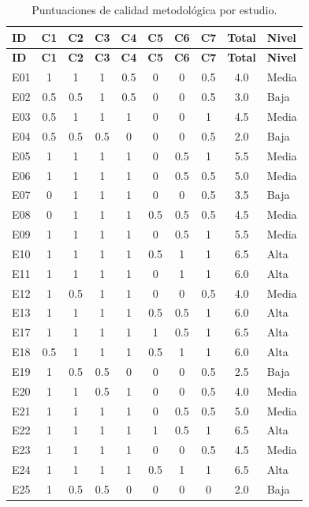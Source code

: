 \begin{longtable}{lccccccccl}
\caption{Puntuaciones de calidad metodológica por estudio.}
\label{tab:calidad} \\
\toprule
\textbf{ID} & \textbf{C1} & \textbf{C2} & \textbf{C3} & \textbf{C4} & \textbf{C5} & \textbf{C6} & \textbf{C7} & \textbf{Total} & \textbf{Nivel} \\
\midrule
\endfirsthead
\toprule
\textbf{ID} & \textbf{C1} & \textbf{C2} & \textbf{C3} & \textbf{C4} & \textbf{C5} & \textbf{C6} & \textbf{C7} & \textbf{Total} & \textbf{Nivel} \\
\midrule
\endhead
E01 & 1 & 1 & 1 & 0.5 & 0 & 0 & 0.5 & 4.0 & Media \\
E02 & 0.5 & 0.5 & 1 & 0.5 & 0 & 0 & 0.5 & 3.0 & Baja \\
E03 & 0.5 & 1 & 1 & 1 & 0 & 0 & 1 & 4.5 & Media \\
E04 & 0.5 & 0.5 & 0.5 & 0 & 0 & 0 & 0.5 & 2.0 & Baja \\
E05 & 1 & 1 & 1 & 1 & 0 & 0.5 & 1 & 5.5 & Media \\
E06 & 1 & 1 & 1 & 1 & 0 & 0.5 & 0.5 & 5.0 & Media \\
E07 & 0 & 1 & 1 & 1 & 0 & 0 & 0.5 & 3.5 & Baja \\
E08 & 0 & 1 & 1 & 1 & 0.5 & 0.5 & 0.5 & 4.5 & Media \\
E09 & 1 & 1 & 1 & 1 & 0 & 0.5 & 1 & 5.5 & Media \\
E10 & 1 & 1 & 1 & 1 & 0.5 & 1 & 1 & 6.5 & Alta \\
E11 & 1 & 1 & 1 & 1 & 0 & 1 & 1 & 6.0 & Alta \\
E12 & 1 & 0.5 & 1 & 1 & 0 & 0 & 0.5 & 4.0 & Media \\
E13 & 1 & 1 & 1 & 1 & 0.5 & 0.5 & 1 & 6.0 & Alta \\
E17 & 1 & 1 & 1 & 1 & 1 & 0.5 & 1 & 6.5 & Alta \\
E18 & 0.5 & 1 & 1 & 1 & 0.5 & 1 & 1 & 6.0 & Alta \\
E19 & 1 & 0.5 & 0.5 & 0 & 0 & 0 & 0.5 & 2.5 & Baja \\
E20 & 1 & 1 & 0.5 & 1 & 0 & 0 & 0.5 & 4.0 & Media \\
E21 & 1 & 1 & 1 & 1 & 0 & 0.5 & 0.5 & 5.0 & Media \\
E22 & 1 & 1 & 1 & 1 & 1 & 0.5 & 1 & 6.5 & Alta \\
E23 & 1 & 1 & 1 & 1 & 0 & 0 & 0.5 & 4.5 & Media \\
E24 & 1 & 1 & 1 & 1 & 0.5 & 1 & 1 & 6.5 & Alta \\
E25 & 1 & 0.5 & 0.5 & 0 & 0 & 0 & 0 & 2.0 & Baja \\
\bottomrule
\end{longtable}


